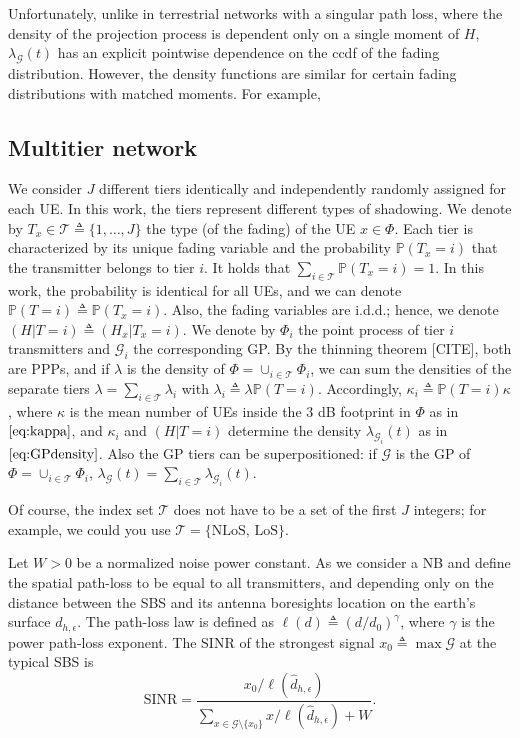 \documentclass[conference]{IEEEtran}
\theoremstyle{definition}
\theoremstyle{plain}
\begin{document}
          Unfortunately, unlike in terrestrial networks with a singular path loss, where the density of the projection process is dependent only on a single moment of $H$, $\lambda_{\mathcal{G}}(t)$ has an explicit pointwise dependence on the ccdf of the fading distribution. However, the density functions are similar for certain fading distributions with matched moments. For example,

          \subsection{Multitier network}

          
          We consider $J$ different tiers identically and independently randomly assigned for each UE. In this work, the tiers represent different types of shadowing. We denote by $T_x \in \mathcal{T} \triangleq \{1,\dots, J\}$ the type (of the fading) of the UE $x \in \Phi $. Each tier is characterized by its unique fading variable and the probability $\mathbb{P}(T_x = i)$ that the transmitter belongs to tier $i$. It holds that $\sum_{i \in \mathcal{T}} \mathbb{P}(T_x = i) =1$. In this work, the probability is identical for all UEs, and we can denote $\mathbb{P}(T = i) \triangleq \mathbb{P}(T_x = i)$. Also, the fading variables are i.d.d.; hence, we denote $(H | T=i) \triangleq (H_x | T_x=i)$. We denote by $\Phi_i$ the point process of tier $i$ transmitters and $\mathcal{G}_i$ the corresponding GP. By the thinning theorem [CITE], both are PPPs, and if $\lambda$ is the density of $\Phi=\cup_{i \in \mathcal{T}} \Phi_i$, we can sum the densities of the separate tiers $\lambda = \sum_{i \in \mathcal{T}} \lambda_i$ with $\lambda_i \triangleq \lambda \mathbb{P}(T = i)$. Accordingly,  ${\kappa}_i \triangleq \mathbb{P}(T = i){\kappa}$, where $\kappa$ is the mean number of UEs inside the $3$ dB footprint in $\Phi$ as in $\eqref{eq:kappa}$, and $\kappa_i$ and $(H|T=i)$ determine the density $\lambda_{\mathcal{G}_i}(t)$ as in $\eqref{eq:GPdensity}$. Also the GP tiers can be superpositioned: if $\mathcal{G}$ is the GP of $\Phi=\cup_{i \in \mathcal{T}} \Phi_i$, $\lambda_{\mathcal{G}}(t)= \sum_{i \in \mathcal{T}}\lambda_{\mathcal{G}_i}(t)$. 

          Of course, the index set $\mathcal{T}$ does not have to be a set of the first $J$ integers; for example, we could you use $\mathcal{T}=\{\text{NLoS, LoS} \}$.

          Let $W>0$ be a normalized noise power constant. As we consider a NB and define the spatial path-loss to be equal to all transmitters, and depending only on the distance between the SBS and its antenna boresights location on the earth's surface $d_{h,\epsilon}$. The path-loss law is defined as $\ell({d}) \triangleq ({d}/d_0)^{\gamma}$, where $\gamma$ is the power path-loss exponent. The SINR of the strongest signal $x_0 \triangleq \max  \mathcal{G}$ at the typical SBS is 
          \begin{equation}
            \text{SINR} = \frac{x_0/\ell(\hat{d}_{h,\epsilon})}{\sum\limits_{x \in \mathcal{G} \setminus \{x_0\}}x/\ell(\hat{d}_{h,\epsilon})+ W}.
          \end{equation}
\end{document}
